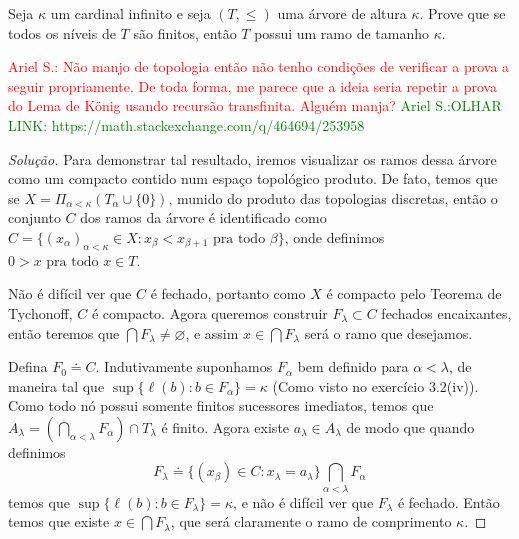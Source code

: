 \documentclass[a4paper]{article}
\theoremstyle{plain}\newtheorem{teo}{Teorema}[section]
\begin{document}
  \begin{exercicio}
  Seja \(\kappa\) um cardinal infinito e seja \((T,\leq)\) uma árvore de altura
  $\kappa$. Prove que se todos os níveis de \(T\) são finitos, então \(T\)
  possui um ramo de tamanho $\kappa$.
\end{exercicio}
\textcolor{red}{Ariel S.: Não manjo de topologia então não tenho condições de
  verificar a prova a seguir propriamente. De toda forma, me parece que a ideia
  seria repetir a prova do Lema de König usando recursão transfinita.
  Alguém manja?}
\textcolor{green}{Ariel S.:OLHAR LINK: https://math.stackexchange.com/q/464694/253958 }

\begin{proof}[Solução]
  
  Para demonstrar tal resultado, iremos visualizar os ramos dessa árvore como um compacto contido num espaço topológico produto.
  De fato, temos que se \(X=\Pi_{\alpha<\kappa}(T_\alpha\cup\{0\})\), munido do produto das topologias discretas, então o conjunto \(C\) dos ramos da árvore é identificado como
  \(C=\{(x_\alpha)_{\alpha<\kappa}\in X : x_\beta<x_{\beta+1}\text{ pra todo }\beta\}\), onde definimos \(0>x\text{ pra todo }x\in T\).
  
  Não é difícil ver que \(C\) é fechado, portanto como \(X\) é compacto pelo Teorema de Tychonoff, \(C\) é compacto.
  Agora queremos construir \(F_\lambda\subset C\) fechados encaixantes, então teremos que \(\bigcap F_\lambda\neq\varnothing\), e assim \(x\in\bigcap F_\lambda\) será o ramo que desejamos.
  
  Defina \(F_0\doteq C\). Indutivamente suponhamos \(F_\alpha\) bem definido para \(\alpha<\lambda\), de maneira tal que \(\sup\{\ell(b):b\in F_\alpha\}=\kappa\) (Como visto no exercício 3.2(iv)).
  Como todo nó possui somente finitos sucessores imediatos, temos que \(A_\lambda=(\bigcap_{\alpha<\lambda} F_\alpha)\cap T_\lambda\) é finito. Agora existe \(a_\lambda\in A_\lambda\) de modo que quando definimos \[F_\lambda\doteq\{(x_\beta)\in C : x_\lambda=a_\lambda\}\bigcap_{\alpha<\lambda} F_\alpha\] temos que \(\sup\{\ell(b): b\in F_\lambda\}=\kappa\), e não é difícil ver que \(F_\lambda\) é fechado.
  Então temos que existe \(x\in\bigcap F_\lambda\), que será claramente o ramo de comprimento \(\kappa\).
  

\end{proof}
\end{document}
